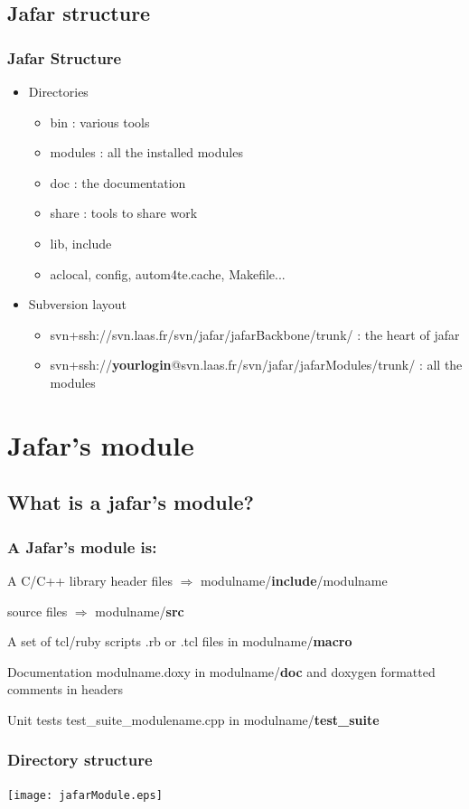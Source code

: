 \documentclass[pdf]{beamer}
\begin{document}
\subsection{Jafar structure}
\begin{frame}
  \frametitle{Jafar Structure}
  \begin{itemize}
  \item<1-> Directories
    \begin{itemize}
    \item<2-> bin : various tools
    \item<3-> modules : all the installed modules
    \item<4-> doc : the documentation
    \item<5-> share : tools to share work
    \item<6-> lib, include
    \item<7-> aclocal, config, autom4te.cache, Makefile...  
    \end{itemize}
  \item<8-> Subversion layout
    \begin{itemize}
    \item<9-> svn+ssh://svn.laas.fr/svn/jafar/jafarBackbone/trunk/ : the heart
      of jafar
    \item<10-> svn+ssh://\textbf{yourlogin}@svn.laas.fr/svn/jafar/jafarModules/trunk/ : all the modules
    \end{itemize}
  \end{itemize}
\end{frame}

\section{Jafar's module}
\subsection{What is a jafar's module?}
\begin{frame}
  \frametitle{A Jafar's module is:}
  \begin{block}{A C/C++ library}
    header files $\Rightarrow$ modulname/\textbf{include}/modulname 
    
    source files $\Rightarrow$ modulname/\textbf{src}
  \end{block}
  \pause
  \begin{block}{A set of tcl/ruby scripts}
    .rb or .tcl files in modulname/\textbf{macro}
  \end{block}
  \pause
  \begin{block}{Documentation}
    modulname.doxy in modulname/\textbf{doc} and doxygen formatted comments in headers
  \end{block}
  \pause
  \begin{block}{Unit tests}
    test\_suite\_modulename.cpp in modulname/\textbf{test\_suite}
  \end{block}
\end{frame}
\begin{frame}
  \frametitle{Directory structure}
  \begin{center}
    \texttt{[image: jafarModule.eps]}
  \end{center}
\end{frame}
\end{document}
